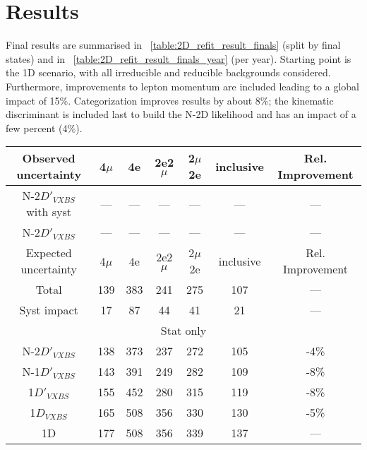 \section{Results}
\label{sec:results}
Final results are summarised in \tablename~\ref{table:2D_refit_result_finals} (split by final states) and in \tablename~\ref{table:2D_refit_result_finals_year} (per year).
Starting point is the 1D scenario, with all irreducible and reducible backgrounds considered.
Furthermore, improvements to lepton momentum are included leading to a global impact of 15\%.
Categorization improves results by about 8\%;
the kinematic discriminant is included last to build the N-2D likelihood and has an impact of a few percent (4\%).
\begin{table}[ht]
\begin{center}
    \begin{tabular}{ccccccc}
    \hline			
    Observed uncertainty	&	4$\mu$	&	4e	&	2e2$\mu$	&2$\mu$2e	& inclusive & Rel. Improvement \\
    \hline			
    N-2$D'_{VXBS}$ with syst	&	---	&	---	&	---	&	---	&	---	&	---	\\
    N-2$D'_{VXBS}$	&	---	&	---	&	---	&	---	&	---	&	---	\\
    \hline			
    \hline			
    Expected uncertainty	&	4$\mu$	&	4e	&	2e2$\mu$	&2$\mu$2e	& inclusive & Rel. Improvement \\
    \hline			
    Total	&	139	&	383	&	241	&	275	&	107	&	---	\\
    \hline
    Syst impact	&	17	&	87	&	44	&	41	&	21	&	---	\\
    \hline
    \multicolumn{7}{c}{Stat only}\\
    \hline
        N-2$D'_{VXBS}$	&	138	&	373	&	237	&	272	&	105	&	-4\%	\\
        N-1$D'_{VXBS}$	&	143	&	391	&	249	&	282	&	109	&	-8\%	\\
        1$D'_{VXBS}$	&	155	&	452	&	280	&	315	&	119	&	-8\%	\\
        1$D_{VXBS}$	&	165	&	508	&	356	&	330	&	130	&	-5\%	\\
        1D	&	177	&	508	&	356	&	339	&	137	&	---	\\

\end{tabular}
\end{center}
\end{table}
